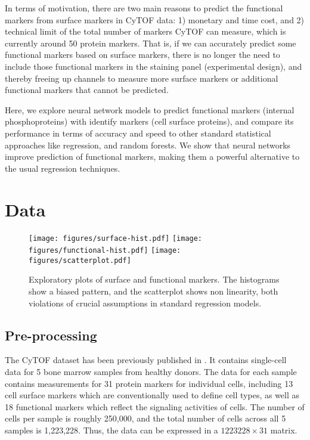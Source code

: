 \documentclass[conference]{IEEEtran}
\begin{document}
In terms of motivation, there are two main reasons to predict the functional markers from surface markers in CyTOF data: 1) monetary and time cost, and 2) technical limit of the total number of markers CyTOF can measure, which is currently around 50 protein markers. That is, if we can accurately predict some functional markers based on surface markers, there is no longer the need to include those functional markers in the staining panel (experimental design), and thereby freeing up channels to measure more surface markers or additional functional markers that cannot be predicted.


Here, we explore neural network models to predict functional markers
(internal phosphoproteins) with identify markers (cell surface
proteins), and compare its performance in terms of accuracy and speed
to other standard statistical approaches like regression, and random
forests.  We show that neural networks improve prediction of
functional markers, making them a powerful alternative to the usual
regression techniques.



\section{Data}


\begin{figure*}
\centering
\texttt{[image: figures/surface-hist.pdf]}
\texttt{[image: figures/functional-hist.pdf]}
\texttt{[image: figures/scatterplot.pdf]}
\caption{Exploratory plots of surface and functional markers. The
  histograms show a biased pattern, and the scatterplot shows non
  linearity, both violations of crucial assumptions in standard
  regression models.}
\label{exploratory}
\end{figure*}


\subsection{Pre-processing}

The CyTOF dataset has been previously published in
\cite{Bendall2011,Qiu2011}. It contains single-cell data for 5 bone marrow samples from healthy donors. The data for each sample contains measurements for 31 protein markers for individual cells, including 13 cell surface markers which are conventionally used to define cell types, as well as 18 functional markers which reflect the signaling activities of cells. The number of cells per sample is roughly 250,000, and the total number of cells across all 5 samples is 1,223,228. Thus, the data can be expressed in a $1223228 \times 31$
matrix.
\end{document}
